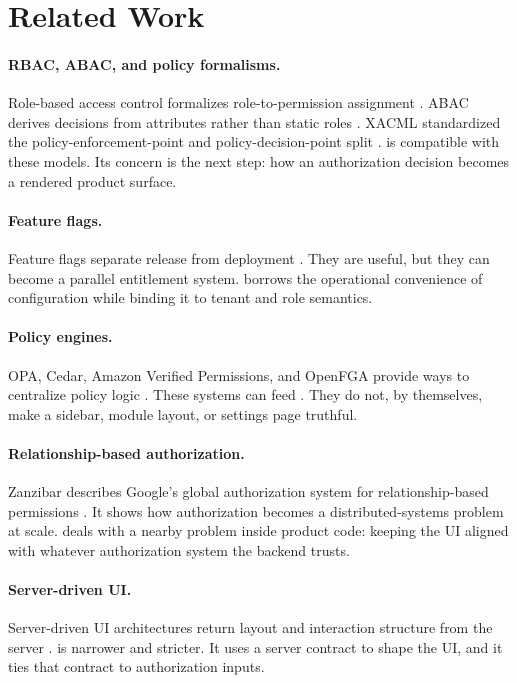 \section{Related Work}
\label{sec:related_work}

\paragraph{RBAC, ABAC, and policy formalisms.}
Role-based access control formalizes role-to-permission assignment \cite{sandhu_rbac}. ABAC derives decisions from attributes rather than static roles \cite{nist_abac}. XACML standardized the policy-enforcement-point and policy-decision-point split \cite{xacml}. \uiPolicy{} is compatible with these models. Its concern is the next step: how an authorization decision becomes a rendered product surface.

\paragraph{Feature flags.}
Feature flags separate release from deployment \cite{fowler_feature_toggles}. They are useful, but they can become a parallel entitlement system. \uiPolicy{} borrows the operational convenience of configuration while binding it to tenant and role semantics.

\paragraph{Policy engines.}
OPA, Cedar, Amazon Verified Permissions, and OpenFGA provide ways to centralize policy logic \cite{opa_docs,cedar_docs,aws_verified_permissions,openfga_docs}. These systems can feed \uiPolicy{}. They do not, by themselves, make a sidebar, module layout, or settings page truthful.

\paragraph{Relationship-based authorization.}
Zanzibar describes Google's global authorization system for relationship-based permissions \cite{zanzibar}. It shows how authorization becomes a distributed-systems problem at scale. \uiPolicy{} deals with a nearby problem inside product code: keeping the UI aligned with whatever authorization system the backend trusts.

\paragraph{Server-driven UI.}
Server-driven UI architectures return layout and interaction structure from the server \cite{airbnb_sdui}. \uiPolicy{} is narrower and stricter. It uses a server contract to shape the UI, and it ties that contract to authorization inputs.

